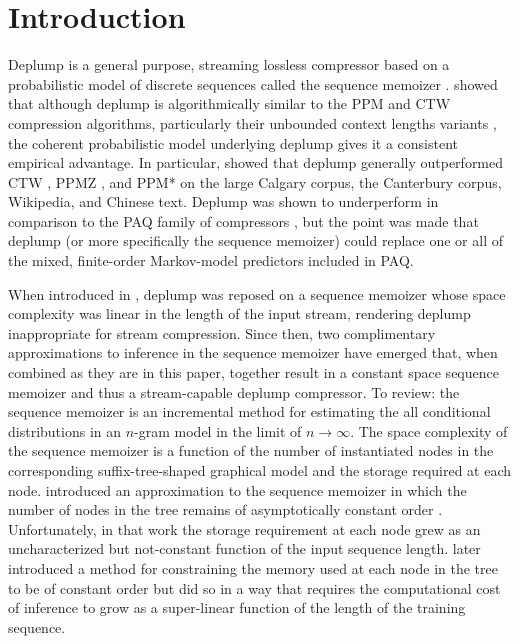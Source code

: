 \section{Introduction}
\label{sec:introduction}

Deplump \citep{Gasthaus2010} is a general purpose, streaming lossless compressor based on a probabilistic model of discrete sequences called the sequence memoizer \citep{Wood2009}.   \citeauthor{Gasthaus2010} showed that although deplump is algorithmically similar to the PPM and CTW compression algorithms, particularly their unbounded context lengths variants \citep{Cleary1997,Willems1998}, the coherent probabilistic model underlying deplump gives it a consistent empirical advantage.  In particular, \citeauthor{Gasthaus2010} showed that deplump generally outperformed CTW  \citep{Willems2009}, PPMZ \citep{Peltola2002}, and PPM* \citep{Cleary1997} on the large Calgary corpus, the Canterbury corpus, Wikipedia, and Chinese text.  Deplump was shown to underperform in comparison to the PAQ family of compressors \citep{Mahoney2005}, but the point was made that deplump (or more specifically the sequence memoizer) could replace one or all of the mixed, finite-order Markov-model predictors included in PAQ.  

When introduced in \citep{Gasthaus2010}, deplump was reposed on a sequence memoizer whose space complexity was linear in the length of the input stream, rendering deplump inappropriate for stream compression.  Since then, two complimentary approximations to inference in the sequence memoizer have emerged that, when combined as they are in this paper, together result in a constant space sequence memoizer and thus a stream-capable deplump compressor. To review: the sequence memoizer is an incremental method for estimating the all conditional distributions in an $n$-gram model in the limit of $n\rightarrow\infty$.  The space complexity of the sequence memoizer is a function of the number of instantiated nodes in the corresponding suffix-tree-shaped graphical model and the storage required at each node. \citeauthor{Bartlett2010} introduced an approximation to the sequence memoizer in which the number of nodes in the tree remains of asymptotically constant order \citep{Bartlett2010}.  Unfortunately, in that work the storage requirement at each node grew as an uncharacterized but not-constant function of the input sequence length.  \citeauthor{Gasthaus2011} later introduced a method for constraining the memory used at each node in the tree to be of constant order  \citep{Gasthaus2011} but did so in a way that requires the computational cost of inference to grow as a super-linear function of the length of the training sequence.

